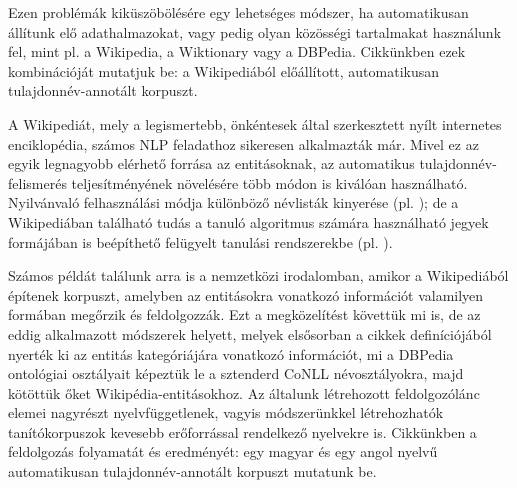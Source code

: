 \documentclass{llncs}
\begin{document}
Ezen problémák kiküszöbölésére egy lehetséges módszer, ha automatikusan állítunk elő  
adathalmazokat, vagy pedig olyan közösségi tartalmakat használunk fel, mint pl. a Wikipedia, a Wiktionary vagy a DBPedia. Cikkünkben ezek kombinációját mutatjuk be: a Wikipediából előállított, automatikusan tulajdonnév-annotált korpuszt.  




A Wikipediát, mely a legismertebb, önkéntesek által szerkesztett nyílt internetes enciklopédia, számos NLP feladathoz sikeresen alkalmazták már. Mivel ez az egyik legnagyobb elérhető forrása az entitásoknak, az automatikus tulajdonnév-felismerés teljesítményének növelésére több módon is kiválóan használható. Nyilvánvaló felhasználási módja különböző névlisták kinyerése (pl. \cite{Toral_2006.a}); de a Wikipediában található tudás a tanuló algoritmus számára használható jegyek formájában is beépíthető felügyelt tanulási rendszerekbe (pl. \cite{KaTo07}). 

Számos példát találunk arra is a nemzetközi irodalomban, amikor a Wikipediából építenek korpuszt, amelyben az entitásokra vonatkozó információt valamilyen formában megőrzik és feldolgozzák. Ezt a megközelítést követtük mi is, de az eddig alkalmazott módszerek helyett, melyek elsősorban a cikkek definíciójából nyerték ki az entitás kategóriájára vonatkozó információt, mi a DBPedia ontológiai osztályait képeztük le a sztenderd CoNLL névosztályokra, majd kötöttük őket Wikipédia-entitásokhoz. Az általunk létrehozott feldolgozólánc elemei nagyrészt nyelvfüggetlenek, vagyis módszerünkkel létrehozhatók tanítókorpuszok kevesebb erőforrással rendelkező nyelvekre is. Cikkünkben a feldolgozás folyamatát és eredményét: egy magyar és egy angol nyelvű automatikusan tulajdonnév-annotált korpuszt mutatunk be.
\end{document}
